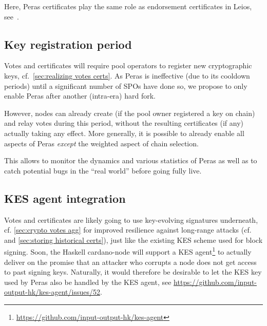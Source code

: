 Here, Peras certificates play the same role as endorsement certificates in Leios, see~\cite[Section 4.4.2]{leios-design-goals-concepts}.

\subsection{Key registration period}

Votes and certificates will require pool operators to register new cryptographic keys, cf.\ \cref{sec:realizing votes certs}.
As Peras is ineffective (due to its cooldown periods) until a significant number of SPOs have done so, we propose to only enable Peras after another (intra-era) hard fork.

However, nodes can already create (if the pool owner registered a key on chain) and relay votes during this period, without the resulting certificates (if any) actually taking any effect.
More generally, it is possible to already enable all aspects of Peras \emph{except} the weighted aspect of chain selection.

This allows to monitor the dynamics and various statistics of Peras as well as to catch potential bugs in the \enquote{real world} before going fully live.

\subsection{KES agent integration}

Votes and certificates are likely going to use key-evolving signatures underneath, cf. \cref{sec:crypto votes agg} for improved resilience against long-range attacks (cf.\ \cite{david2018ouroboros} and \cref{sec:storing historical certs}), just like the existing KES scheme used for block signing.
Soon, the Haskell cardano-node will support a KES agent\footnote{\url{https://github.com/input-output-hk/kes-agent}} to actually deliver on the promise that an attacker who corrupts a node does not get access to past signing keys.
Naturally, it would therefore be desirable to let the KES key used by Peras also be handled by the KES agent, see \url{https://github.com/input-output-hk/kes-agent/issues/52}.

